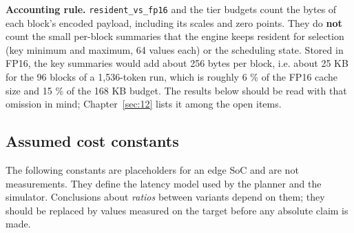 \documentclass[12pt,a4paper]{report}
\begin{document}
\textbf{Accounting rule.} \texttt{resident\_\allowbreak{}\allowbreak{}vs\_\allowbreak{}\allowbreak{}fp16} and the tier budgets count the bytes of each block's encoded payload, including its scales and zero points. They do \textbf{not} count the small per-block summaries that the engine keeps resident for selection (key minimum and maximum, 64 values each) or the scheduling state. Stored in FP16, the key summaries would add about 256 bytes per block, i.e. about 25 KB for the 96 blocks of a 1,536-token run, which is roughly 6 \% of the FP16 cache size and 15 \% of the 168 KB budget. The results below should be read with that omission in mind; Chapter~\ref{sec:12} lists it among the open items.

\subsection{Assumed cost constants}\label{sec:7_4}
The following constants are placeholders for an edge SoC and are not measurements. They define the latency model used by the planner and the simulator. Conclusions about \textit{ratios} between variants depend on them; they should be replaced by values measured on the target before any absolute claim is made.
\end{document}
